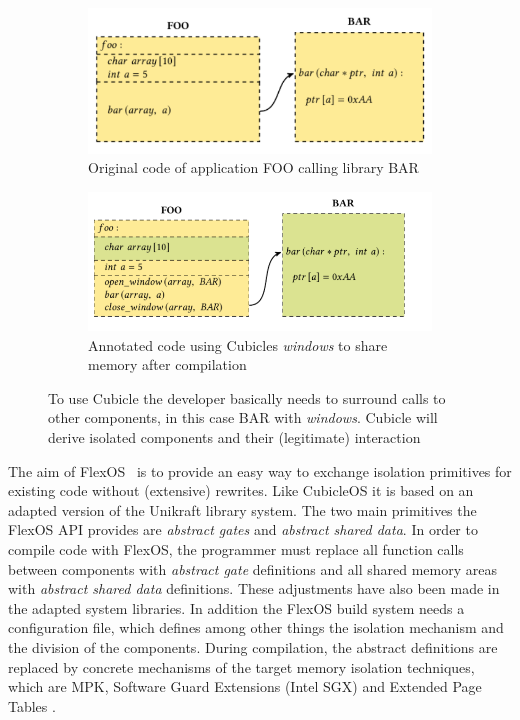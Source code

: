 \begin{figure}[H]
    \begin{subfigure}[b]{0.45\textwidth}
         \includegraphics[width=\textwidth]{figures/cubicle_example_original.png}
         \caption{Original code of application FOO calling library BAR}
         \label{cubicleOriginal}
     \end{subfigure}
     \hfill
     \begin{subfigure}[b]{0.45\textwidth}
         \includegraphics[width=\textwidth]{figures/cubicle_example_windows.png}
         \caption{Annotated code using Cubicles \textit{windows} to share memory after compilation}
         \label{cubicleWindow}
     \end{subfigure}
    \caption{To use Cubicle the developer basically needs to surround calls to other components, in this case BAR with \textit{windows}. Cubicle will derive isolated components and their (legitimate) interaction}
    \label{fig:CubicleAPI}
    \end{figure}

The aim of FlexOS~\cite{lefeuvre2021flexos} is to provide an easy way to exchange isolation primitives for existing code without (extensive) rewrites. Like CubicleOS it is based on an adapted version of the Unikraft library system. The two main primitives the FlexOS API provides are \emph{abstract gates} and \emph{abstract shared data}. In order to compile code with FlexOS, the programmer must replace all function calls between components with \emph{abstract gate} definitions and all shared memory areas with \emph{abstract shared data} definitions. These adjustments have also been made in the adapted system libraries. In addition the FlexOS build system needs a configuration file, which defines among other things the isolation mechanism and the division of the components. During compilation, the abstract definitions are replaced by concrete mechanisms of the target memory isolation techniques, which are MPK, Software Guard Extensions (Intel SGX) and Extended Page Tables \cite{intel64and}. 

